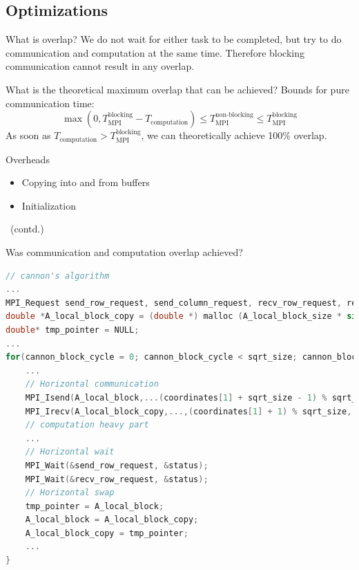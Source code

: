 \documentclass[9pt,pdftex]{beamer}
\begin{document}
\subsection{Optimizations}
\begin{frame}{\insertsubsection}
\begin{block}{What is overlap?}
We do not wait for either task to be completed, but try to do communication and computation at the same time. Therefore blocking communication cannot result in any overlap.
\end{block}
\begin{block}{What is the theoretical maximum overlap that can be achieved?}
Bounds for pure communication time: 
$$\max\left(0, T_\text{MPI}^\text{blocking} - T_\text{computation}\right) \leq T_\text{MPI}^\text{non-blocking} \leq T_\text{MPI}^\text{blocking}$$
As soon as $T_\text{computation}>T_\text{MPI}^\text{blocking}$, we can theoretically achieve 100\% overlap.
\end{block}
\begin{block}{Overheads}
\begin{itemize}
\item Copying into and from buffers
\item Initialization
\end{itemize}
\end{block}
\end{frame}

\begin{frame}[fragile]{\insertsubsection \ (contd.)}
\begin{block}{Was communication and computation overlap achieved?}
\begin{lstlisting}[language=C, basicstyle=\scriptsize, keepspaces=true, columns=flexible]
// cannon's algorithm
...
MPI_Request send_row_request, send_column_request, recv_row_request, recv_column_request;
double *A_local_block_copy = (double *) malloc (A_local_block_size * sizeof(double));
double* tmp_pointer = NULL;
...
for(cannon_block_cycle = 0; cannon_block_cycle < sqrt_size; cannon_block_cycle++){
    ...
    // Horizontal communication
    MPI_Isend(A_local_block,...(coordinates[1] + sqrt_size - 1) % sqrt_size,...,row_communicator, &send_row_request);		
    MPI_Irecv(A_local_block_copy,...,(coordinates[1] + 1) % sqrt_size,...,row_communicator, &recv_row_request);
    // computation heavy part 
    ...		
    // Horizontal wait
    MPI_Wait(&send_row_request, &status);
    MPI_Wait(&recv_row_request, &status);
    // Horizontal swap
    tmp_pointer = A_local_block;
    A_local_block = A_local_block_copy;
    A_local_block_copy = tmp_pointer;
    ...		
}
\end{lstlisting}
\end{block}
\end{frame}
\end{document}
